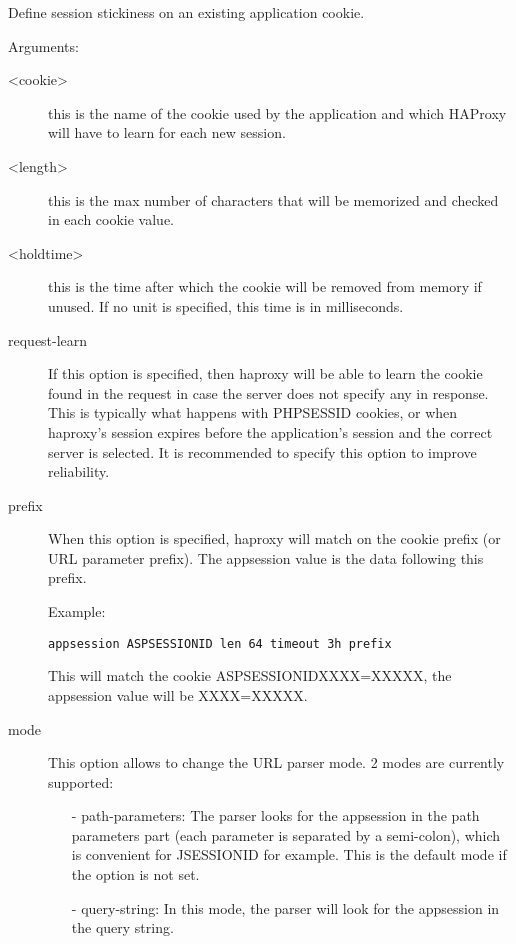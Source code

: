   Define session stickiness on an existing application cookie.
  
  
  Arguments:
  \begin{description}
  \item[<cookie>]   this is the name of the cookie used by the application and which
               HAProxy will have to learn for each new session.

  \item[<length>]   this is the max number of characters that will be memorized and
               checked in each cookie value.

  \item[<holdtime>] this is the time after which the cookie will be removed from
               memory if unused. If no unit is specified, this time is in
               milliseconds.

  \item[request-learn]
               If this option is specified, then haproxy will be able to learn
               the cookie found in the request in case the server does not
               specify any in response. This is typically what happens with
               PHPSESSID cookies, or when haproxy's session expires before
               the application's session and the correct server is selected.
               It is recommended to specify this option to improve reliability.

  \item[prefix]     When this option is specified, haproxy will match on the cookie
               prefix (or URL parameter prefix). The appsession value is the
               data following this prefix.

               Example:
               
               \verb|appsession ASPSESSIONID len 64 timeout 3h prefix|

               This will match the cookie ASPSESSIONIDXXXX=XXXXX,
               the appsession value will be XXXX=XXXXX.

  \item[mode]       This option allows to change the URL parser mode.
               2 modes are currently supported:
               \begin{itemize}
               \item[-] path-parameters:
                 The parser looks for the appsession in the path parameters
                 part (each parameter is separated by a semi-colon), which is
                 convenient for JSESSIONID for example.
                 This is the default mode if the option is not set.
               \item[-] query-string:
                 In this mode, the parser will look for the appsession in the
                 query string.
              \end{itemize}
  \end{description}


